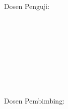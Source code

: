 \vspace{5mm}
\begin{multicols}{2}
    \begin{flushleft}
        Dosen Penguji: \\

        \vspace{20mm}              
        \pengujiSatuNama\\
        \pengujiSatuNIP\\

        \vspace{20mm}
        \pengujiDuaNama\\
        \pengujiDuaNIP\\

        \vspace{20mm}
        \pengujiTigaNama\\
        \pengujiTigaNIP\\

        \vspace{20mm}
        \pengujiEmpatNama\\
        \pengujiEmpatNIP\\
    \end{flushleft}
    \columnbreak
    \begin{flushleft}
        Dosen Pembimbing: \\

        \vspace{20mm}              
        \pembimbingSatuNama \\
        \pembimbingSatuNIP\\

        \vspace{20mm}
        \pembimbingDuaNama \\
        \pembimbingDuaNIP
    \end{flushleft}
\end{multicols}